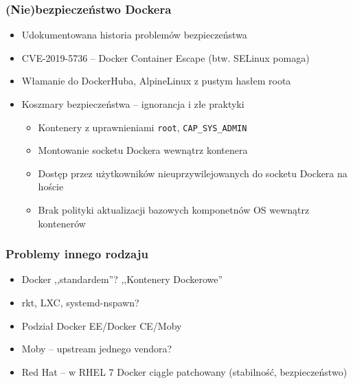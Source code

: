\documentclass[dvipsnames,table]{beamer}
\begin{document}
\begin{frame}
	\frametitle{(Nie)bezpieczeństwo Dockera}
	\begin{itemize}
		\item Udokumentowana historia problemów bezpieczeństwa
		\item CVE-2019-5736 -- Docker Container Escape (btw. SELinux pomaga)
		\item Włamanie do DockerHuba, AlpineLinux z pustym hasłem roota
		\item Koszmary bezpieczeństwa -- ignorancja i złe praktyki
		\begin{itemize}
			\item Kontenery z uprawnieniami {\tt root}, {\tt CAP\_SYS\_ADMIN}
			\item Montowanie socketu Dockera wewnątrz kontenera
			\item Dostęp przez użytkowników nieuprzywilejowanych do socketu Dockera na hoście
			\item Brak polityki aktualizacji bazowych komponetnów OS wewnątrz kontenerów
		\end{itemize}

	\end{itemize}
\end{frame}

\begin{frame}
	\frametitle{Problemy innego rodzaju}
	\begin{itemize}
		\item Docker ,,standardem''? ,,Kontenery Dockerowe''
		\item rkt, LXC, systemd-nspawn?
		\item Podział Docker EE/Docker CE/Moby
		\item Moby -- upstream jednego vendora?
		\item Red Hat -- w RHEL 7 Docker ciągle patchowany (stabilność, bezpieczeństwo)
	\end{itemize}
\end{frame}
\end{document}
